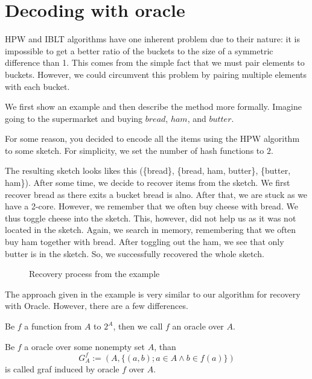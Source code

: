 \FloatBarrier

\section{Decoding with oracle}\label{dec_oracle}
HPW and IBLT algorithms have one inherent problem due to their nature: it is impossible to get a better ratio of the buckets to the size of a symmetric difference than 1. This comes from the simple fact that we must pair elements to buckets. However, we could circumvent this problem by pairing multiple elements with each bucket. 

We first show an example and then describe the method more formally. Imagine going to the supermarket and buying $bread$, $ham$, and $butter$.

For some reason, you decided to encode all the items using the HPW algorithm to some sketch. For simplicity, we set the number of hash functions to $2$.

The resulting sketch looks likes this (\{bread\}, \{bread, ham, butter\}, \{butter, ham\}). After some time, we decide to recover items from the sketch. We first recover bread as there exits a bucket bread is alno. After that, we are stuck as we have a 2-core. However, we remember that we often buy cheese with bread. We thus toggle cheese into the sketch. This, however, did not help us as it was not located in the sketch. Again, we search in memory, remembering that we often buy ham together with bread. After toggling out the ham, we see that only butter is 
in the sketch. So, we successfully recovered the whole sketch.

\begin{figure}
    \centering
      

    \caption{Recovery process from the example}
    \label{fig:enter-label}
\end{figure}

The approach given in the example is very similar to our algorithm for recovery with Oracle. However, there are a few differences.


\begin{defn}
Be $f$ a function from $A$ to $2^A$, then we call $f$ an oracle over $A$. 
\end{defn}

\begin{defn}
Be $f$ a oracle over some nonempty set $A$, than $$G_A^f := (A, \{(a, b); a \in A \land b \in f(a) \})$$ is called graf induced by oracle $f$ over $A$. 
\end{defn}



